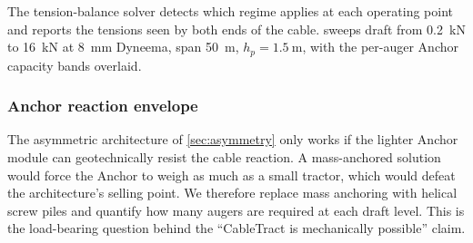 \documentclass[11pt,a4paper]{article}
\begin{document}
The tension-balance solver detects which regime applies at each operating point and reports the tensions seen by both ends of the cable.  sweeps draft from \SI{0.2}{\kilo\newton} to \SI{16}{\kilo\newton} at \SI{8}{\milli\meter} Dyneema, span \SI{50}{\meter}, $h_p = \SI{1.5}{\meter}$, with the per-auger Anchor capacity bands overlaid.

\subsubsection{Anchor reaction envelope}\label{sec:anchor}

The asymmetric architecture of \cref{sec:asymmetry} only works if the lighter Anchor module can geotechnically resist the cable reaction. A mass-anchored solution would force the Anchor to weigh as much as a small tractor, which would defeat the architecture's selling point. We therefore replace mass anchoring with helical screw piles and quantify how many augers are required at each draft level. This is the load-bearing question behind the ``CableTract is mechanically possible'' claim.
\end{document}
